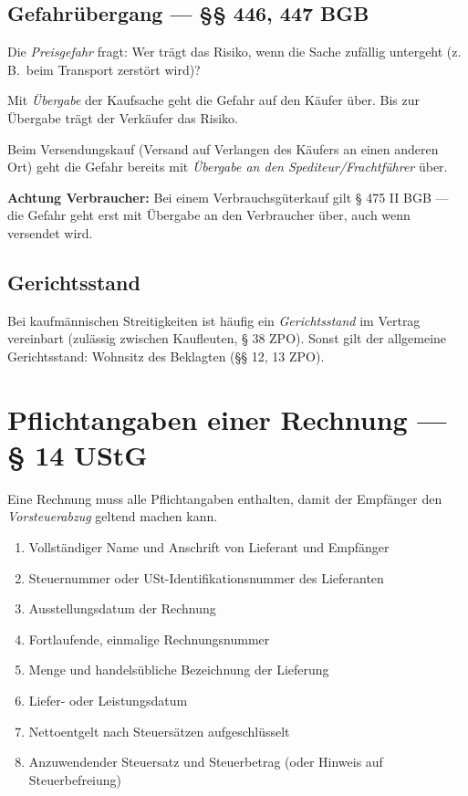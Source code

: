 \documentclass[11pt, a4paper]{article}
\begin{document}
\subsection{Gefahrübergang --- §§ 446, 447 BGB}

Die \emph{Preisgefahr} fragt: Wer trägt das Risiko, wenn die Sache zufällig untergeht
(z.\,B.\ beim Transport zerstört wird)?

\begin{merksatz}[title={§ 446 BGB --- Grundregel}]
Mit \emph{Übergabe} der Kaufsache geht die Gefahr auf den Käufer über. Bis zur
Übergabe trägt der Verkäufer das Risiko.
\end{merksatz}

\begin{merksatz}[title={§ 447 BGB --- Versendungskauf}]
Beim Versendungskauf (Versand auf Verlangen des Käufers an einen anderen Ort) geht
die Gefahr bereits mit \emph{Übergabe an den Spediteur/Frachtführer} über.
\end{merksatz}

\textbf{Achtung Verbraucher:} Bei einem Verbrauchsgüterkauf gilt § 475 II BGB --- die
Gefahr geht erst mit Übergabe an den Verbraucher über, auch wenn versendet wird.

\subsection{Gerichtsstand}

Bei kaufmännischen Streitigkeiten ist häufig ein \emph{Gerichtsstand} im Vertrag
vereinbart (zulässig zwischen Kaufleuten, § 38 ZPO). Sonst gilt der allgemeine
Gerichtsstand: Wohnsitz des Beklagten (§§ 12, 13 ZPO).

\section{Pflichtangaben einer Rechnung --- § 14 UStG}

Eine Rechnung muss alle Pflichtangaben enthalten, damit der Empfänger den
\emph{Vorsteuerabzug} geltend machen kann.

\begin{merksatz}[title={Die wichtigsten Pflichtangaben}]
\begin{enumerate}[itemsep=0pt]
  \item Vollständiger Name und Anschrift von Lieferant und Empfänger
  \item Steuernummer oder USt-Identifikationsnummer des Lieferanten
  \item Ausstellungsdatum der Rechnung
  \item Fortlaufende, einmalige Rechnungsnummer
  \item Menge und handelsübliche Bezeichnung der Lieferung
  \item Liefer- oder Leistungsdatum
  \item Nettoentgelt nach Steuersätzen aufgeschlüsselt
  \item Anzuwendender Steuersatz und Steuerbetrag (oder Hinweis auf Steuerbefreiung)
\end{enumerate}
\end{merksatz}
\end{document}

